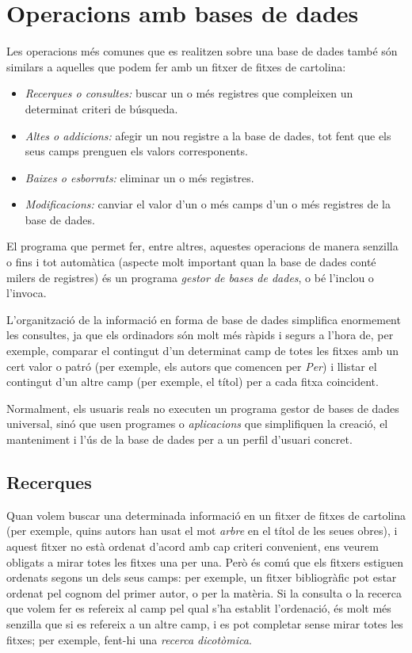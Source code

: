 \section{Operacions amb bases de dades}


Les operacions més comunes 
que es realitzen sobre una base de dades també són
similars a aquelles que podem fer amb un fitxer de fitxes de 
cartolina:
\begin{itemize}
\item \emph{Recerques o consultes:} buscar un o més registres que
  compleixen un determinat criteri de búsqueda.
\item \emph{Altes o addicions:} afegir un nou registre a la base de dades,
  tot fent que els seus camps prenguen els valors corresponents.
\item \emph{Baixes o esborrats:} eliminar un o més registres.
\item \emph{Modificacions:} canviar el valor d'un o més camps d'un o
  més registres de la base de dades.
\end{itemize}

El programa que permet fer, entre altres, aquestes operacions
de manera senzilla o fins i tot automàtica
(aspecte molt important quan la base de dades conté milers de
registres)  és un programa \emph{gestor de bases de
  dades}, o bé l'inclou o l'invoca.


L'organització de la informació en forma de base de dades simplifica
enormement les consultes, ja que els ordinadors són molt més ràpids i
segurs a l'hora de, per exemple, comparar el contingut d'un
determinat camp de totes les fitxes amb un cert valor o patró (per
exemple, els autors que comencen per \emph{Per}) i llistar el
contingut d'un altre camp (per exemple, el títol) per a cada fitxa
coincident. 

Normalment, els usuaris reals no executen un programa gestor de bases
de dades universal, sinó que usen programes o \emph{aplicacions} que
simplifiquen la creació, el manteniment i l'ús de la base de dades per
a un perfil d'usuari concret.



\subsection{Recerques}

Quan volem buscar una determinada informació en un fitxer de fitxes de
cartolina (per exemple, quins autors han usat el
mot \emph{arbre} en el
títol de les seues obres), i aquest fitxer no està ordenat d'acord amb cap
criteri convenient, ens veurem obligats a mirar totes les fitxes una
per una.  Però és comú que els fitxers estiguen ordenats segons un
dels seus camps: per exemple, un fitxer bibliogràfic pot estar ordenat
pel cognom del primer autor, o per la matèria. Si la consulta o la
recerca que volem fer es refereix al camp pel qual s'ha establit
l'ordenació, és molt més senzilla que si es refereix a un altre camp,
i es pot completar sense mirar totes les fitxes; per exemple, fent-hi
una \emph{recerca dicotòmica}.

